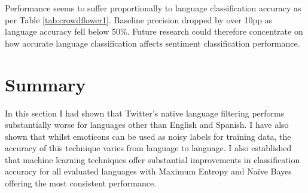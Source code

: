 Performance seems to suffer proportionally to language classification accuracy as per Table \ref{tab:crowdflower1}. Baseline precision dropped by over 10pp as language accuracy fell below  50\%. Future research could therefore concentrate on how accurate language classification affects sentiment classification performance.

\section{Summary}

In this section I had shown that Twitter's native language filtering performs substantially worse for languages other than English and Spanish. I have also shown that whilst emoticons can be used as noisy labels for training data, the accuracy of this technique varies from language to language. I also established that machine learning techniques offer substantial improvements in classification accuracy for all evaluated languages with Maximum Entropy and Na\"ive Bayes offering the most consistent performance.